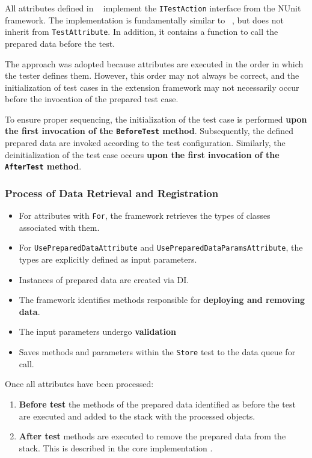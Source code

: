 All attributes defined in ~ implement the \texttt{ITestAction} interface from the NUnit framework. The implementation is fundamentally similar to ~, but does not inherit from \texttt{TestAttribute}. In addition, it contains a function to call the prepared data before the test.

The approach was adopted because attributes are executed in the order in which the tester defines them. However, this order may not always be correct, and the initialization of test cases in the extension framework may not necessarily occur before the invocation of the prepared test case.  

To ensure proper sequencing, the initialization of the test case is performed \textbf{upon the first invocation of the \texttt{BeforeTest} method}. Subsequently, the defined prepared data are invoked according to the test configuration. Similarly, the deinitialization of the test case occurs \textbf{upon the first invocation of the \texttt{AfterTest} method}.  

\subsubsection{Process of Data Retrieval and Registration}

\begin{itemize}
    \item For attributes with \texttt{For}, the framework retrieves the types of classes associated with them.
    \item For \texttt{UsePreparedDataAttribute} and \texttt{UsePreparedDataParamsAttribute}, the types are explicitly defined as input parameters.
    \item Instances of prepared data are created via \ac{DI}.
    \item The framework identifies methods responsible for \textbf{deploying and removing data}.
    \item The input parameters undergo \textbf{validation}
    \item Saves methods and parameters within the \texttt{Store} test to the data queue for call.
\end{itemize}

Once all attributes have been processed:

\begin{enumerate}
    \item \textbf{Before test} the methods of the prepared data identified as before the test are executed and added to the stack with the processed objects.
    \item \textbf{After test} methods are executed to remove the prepared data from the stack. This is described in the core implementation .
\end{enumerate}

